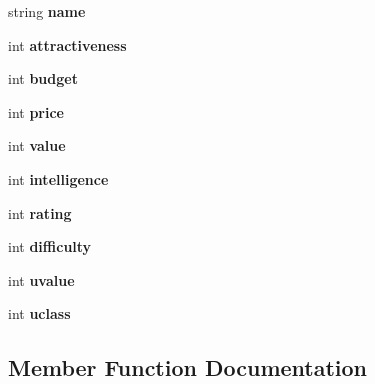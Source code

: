 \begin{DoxyCompactItemize}
\item 
string {\bfseries name}\hypertarget{class_test_acfd5eea729bcb46d3ed7a7861bead031}{}\label{class_test_acfd5eea729bcb46d3ed7a7861bead031}

\item 
int {\bfseries attractiveness}\hypertarget{class_test_a939afbc0e20a7e4b27aece8f881b50d9}{}\label{class_test_a939afbc0e20a7e4b27aece8f881b50d9}

\item 
int {\bfseries budget}\hypertarget{class_test_a5e40fe9de897fe337a5ff1a4f8634e01}{}\label{class_test_a5e40fe9de897fe337a5ff1a4f8634e01}

\item 
int {\bfseries price}\hypertarget{class_test_a0bb5830d402f7315018929259f82945f}{}\label{class_test_a0bb5830d402f7315018929259f82945f}

\item 
int {\bfseries value}\hypertarget{class_test_ad55002283eba8ffa062dfb849f6c077c}{}\label{class_test_ad55002283eba8ffa062dfb849f6c077c}

\item 
int {\bfseries intelligence}\hypertarget{class_test_a5ec6de7ef811ddb03c60095f75773363}{}\label{class_test_a5ec6de7ef811ddb03c60095f75773363}

\item 
int {\bfseries rating}\hypertarget{class_test_ad60ae7ce12cccdc3956c40a67da7216a}{}\label{class_test_ad60ae7ce12cccdc3956c40a67da7216a}

\item 
int {\bfseries difficulty}\hypertarget{class_test_af61b88fc7c90c7ccf98feecdbf376456}{}\label{class_test_af61b88fc7c90c7ccf98feecdbf376456}

\item 
int {\bfseries uvalue}\hypertarget{class_test_a9aecc3550fb1d7943d63ebfd24b4da3e}{}\label{class_test_a9aecc3550fb1d7943d63ebfd24b4da3e}

\item 
int {\bfseries uclass}\hypertarget{class_test_adb56dfb8fa01ae978f4de361b575fb60}{}\label{class_test_adb56dfb8fa01ae978f4de361b575fb60}

\end{DoxyCompactItemize}


\subsection{Member Function Documentation}

